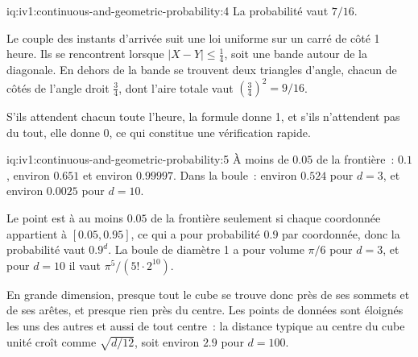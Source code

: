 \begin{solution}{iq:iv1:continuous-and-geometric-probability:4}
La probabilité vaut $7/16$.

Le couple des instants d'arrivée suit une loi uniforme sur un carré de côté 1 heure. Ils se rencontrent lorsque $|X - Y| \le \tfrac14$, soit une bande autour de la diagonale. En dehors de la bande se trouvent deux triangles d'angle, chacun de côtés de l'angle droit $\tfrac34$, dont l'aire totale vaut $(\tfrac34)^2 = 9/16$.

S'ils attendent chacun toute l'heure, la formule donne 1, et s'ils n'attendent pas du tout, elle donne 0, ce qui constitue une vérification rapide.

\end{solution}

\begin{solution}{iq:iv1:continuous-and-geometric-probability:5}
À moins de $0.05$ de la frontière~: $0.1$, environ $0.651$ et environ $0.99997$. Dans la boule~: environ $0.524$ pour $d = 3$, et environ $0.0025$ pour $d = 10$.

Le point est à au moins $0.05$ de la frontière seulement si chaque coordonnée appartient à $[0.05, 0.95]$, ce qui a pour probabilité $0.9$ par coordonnée, donc la probabilité vaut $0.9^d$. La boule de diamètre 1 a pour volume $\pi/6$ pour $d = 3$, et pour $d = 10$ il vaut $\pi^5/(5! \cdot 2^{10})$.

En grande dimension, presque tout le cube se trouve donc près de ses sommets et de ses arêtes, et presque rien près du centre. Les points de données sont éloignés les uns des autres et aussi de tout centre~: la distance typique au centre du cube unité croît comme $\sqrt{d/12}$, soit environ $2.9$ pour $d = 100$.

\end{solution}

